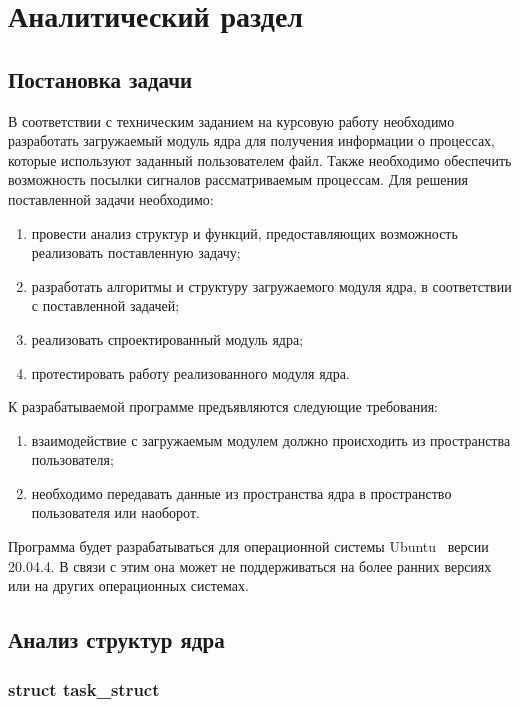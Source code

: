 \chapter{Аналитический раздел}

\section{Постановка задачи}

В соответствии с техническим заданием на курсовую работу необходимо разработать загружаемый модуль ядра для получения информации о процессах, которые используют заданный пользователем файл. 
Также необходимо обеспечить возможность посылки сигналов рассматриваемым процессам. 
Для решения поставленной задачи необходимо:
\begin{enumerate}[label=\arabic*.]
	\item провести анализ структур и функций, предоставляющих возможность реализовать поставленную задачу;
	\item разработать алгоритмы и структуру загружаемого модуля ядра, в соответствии с поставленной задачей;
	\item реализовать спроектированный модуль ядра;
	\item протестировать работу реализованного модуля ядра.
\end{enumerate}

К разрабатываемой программе предъявляются следующие требования:
\begin{enumerate}[label=\arabic*.]
	\item взаимодействие с загружаемым модулем должно происходить из пространства пользователя;
	\item необходимо передавать данные из пространства ядра в пространство пользователя или наоборот.
\end{enumerate}

Программа будет разрабатываться для операционной системы Ubuntu~\cite{ubuntu} версии 20.04.4. 
В связи с этим она может не поддерживаться на более ранних версиях или на других операционных системах.

\section{Анализ структур ядра}

\subsection{struct task\_struct}

